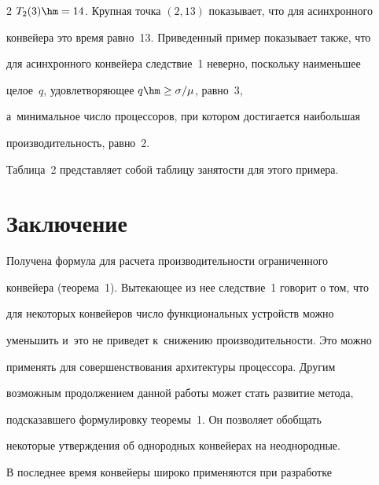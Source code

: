 \begin{multicols}{2}
$T_2(3)\hm=14$. Крупная точка $(2,13)$ показывает, что для асинхронного 


конвейера это время равно~13. Приведенный пример показывает также, что 


для асинхронного конвейера следствие~1 неверно, поскольку наименьшее 


целое~$q$, удовлетворяющее $q\hm\geq \sigma/\mu$, равно~3, 


а~минимальное число процессоров, при котором достигается наибольшая 


производительность, равно~2.


  








  Таблица~2 представляет собой таблицу занятости для этого примера.


  


\vspace*{-6pt}





\section{Заключение}





  Получена формула для расчета производительности ограниченного 


конвейера (теорема~1). Вытекающее из нее следствие~1 говорит о том, что\linebreak 


для некоторых конвейеров число функциональных устройств можно 


уменьшить и~это не приведет к~снижению производительности. Это \mbox{можно} 


применять для совершенствования архитектуры процес\-со\-ра. Другим 


возможным продолжением данной работы может стать развитие метода, 


подсказавшего формулировку теоремы~1. Он позволяет обобщать 


некоторые утверждения об однородных конвейерах на неоднородные. 


  


  В последнее время конвейеры широко применяются при разработке 



\end{multicols}
